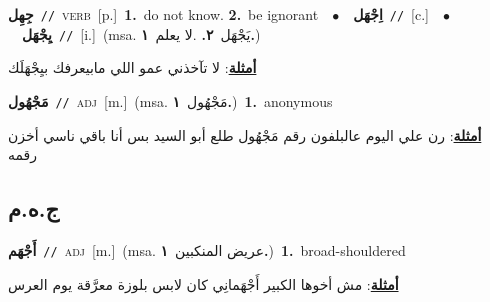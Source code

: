 \documentclass[10pt,a4paper,twoside]{article} %
\begin{document}
\begin{multicols}{2}
{\setlength\topsep{0pt}\textbf{\foreignlanguage{arabic}{جِهِل}}\ {\color{gray}\texttt{//}\color{black}}\ \textsc{verb}\ [p.]\ \textbf{1.}~do not know.  \textbf{2.}~be ignorant\ \ $\bullet$\ \ \setlength\topsep{0pt}\textbf{\foreignlanguage{arabic}{اِجْهَل}}\ {\color{gray}\texttt{//}\color{black}}\ [c.]\ \ $\bullet$\ \ \setlength\topsep{0pt}\textbf{\foreignlanguage{arabic}{يِجْهَل}}\ {\color{gray}\texttt{//}\color{black}}\ [i.]\ \color{gray}(msa. \foreignlanguage{arabic}{يَجْهَل}~\foreignlanguage{arabic}{\textbf{٢.}}  .\foreignlanguage{arabic}{لا يعلم}~\foreignlanguage{arabic}{\textbf{١.}})\color{black}\  \begin{flushright}\color{gray}\foreignlanguage{arabic}{\textbf{\underline{\foreignlanguage{arabic}{أمثلة}}}: لا تآخذني عمو اللي مابيعرفك بيِجْهَلَك}\end{flushright}\color{black}} \vspace{2mm}

{\setlength\topsep{0pt}\textbf{\foreignlanguage{arabic}{مَجْهُول}}\ {\color{gray}\texttt{//}\color{black}}\ \textsc{adj}\ [m.]\ \color{gray}(msa. \foreignlanguage{arabic}{مَجْهُول}~\foreignlanguage{arabic}{\textbf{١.}})\color{black}\ \textbf{1.}~anonymous\  \begin{flushright}\color{gray}\foreignlanguage{arabic}{\textbf{\underline{\foreignlanguage{arabic}{أمثلة}}}: رن علي اليوم عالبلفون رقم مَجْهُول طلع أبو السيد بس أنا باقي ناسي أخزن رقمه}\end{flushright}\color{black}} \vspace{2mm}

\vspace{-3mm}
\subsection*{\color{blue}\foreignlanguage{arabic}{ج.ه.م}\color{blue}{}} 

{\setlength\topsep{0pt}\textbf{\foreignlanguage{arabic}{أَجْهَم}}\ {\color{gray}\texttt{//}\color{black}}\ \textsc{adj}\ [m.]\ \color{gray}(msa. \foreignlanguage{arabic}{عريض المنكبين}~\foreignlanguage{arabic}{\textbf{١.}})\color{black}\ \textbf{1.}~broad-shouldered\  \begin{flushright}\color{gray}\foreignlanguage{arabic}{\textbf{\underline{\foreignlanguage{arabic}{أمثلة}}}: مش أخوها الكبير أَجْهَمانِي كان لابس بلوزة معرَّقة يوم العرس}\end{flushright}\color{black}} \vspace{2mm}


\end{multicols}
\end{document}
